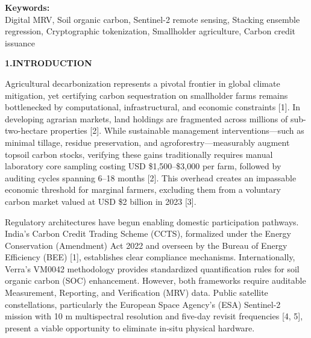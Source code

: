 \documentclass[11pt,a4paper]{article}
\begin{document}
\noindent \textbf{Keywords:} \\
Digital MRV, Soil organic carbon, Sentinel-2 remote sensing, Stacking ensemble regression, Cryptographic tokenization, Smallholder agriculture, Carbon credit issuance
\vspace{1.5em}

\noindent \textbf{\large 1.INTRODUCTION}
\vspace{0.5em}

\noindent Agricultural decarbonization represents a pivotal frontier in global climate mitigation, yet certifying carbon sequestration on smallholder farms remains bottlenecked by computational, infrastructural, and economic constraints [1]. In developing agrarian markets, land holdings are fragmented across millions of sub-two-hectare properties [2]. While sustainable management interventions---such as minimal tillage, residue preservation, and agroforestry---measurably augment topsoil carbon stocks, verifying these gains traditionally requires manual laboratory core sampling costing USD \$1,500--\$3,000 per farm, followed by auditing cycles spanning 6--18 months [2]. This overhead creates an impassable economic threshold for marginal farmers, excluding them from a voluntary carbon market valued at USD \$2 billion in 2023 [3].

Regulatory architectures have begun enabling domestic participation pathways. India's Carbon Credit Trading Scheme (CCTS), formalized under the Energy Conservation (Amendment) Act 2022 and overseen by the Bureau of Energy Efficiency (BEE) [1], establishes clear compliance mechanisms. Internationally, Verra's VM0042 methodology provides standardized quantification rules for soil organic carbon (SOC) enhancement. However, both frameworks require auditable Measurement, Reporting, and Verification (MRV) data. Public satellite constellations, particularly the European Space Agency's (ESA) Sentinel-2 mission with 10 m multispectral resolution and five-day revisit frequencies [4, 5], present a viable opportunity to eliminate in-situ physical hardware.
\end{document}
